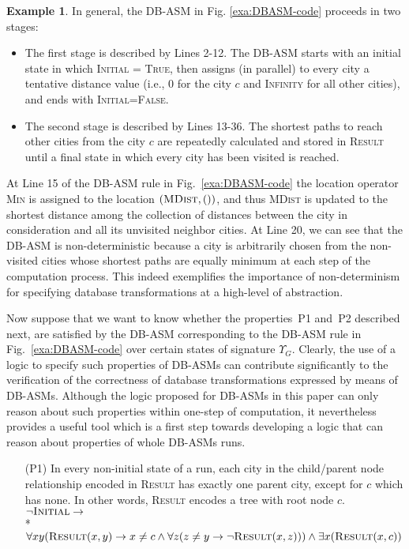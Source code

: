 \documentclass[preprint,11pt]{elsarticle}
\theoremstyle{definition}
\newtheorem{example}{Example}[section]
\theoremstyle{remark}
\begin{document}
\begin{example}
In general, the DB-ASM in Fig. \ref{exa:DBASM-code} proceeds in two stages:

\begin{itemize}

\item The first
stage is described by Lines 2-12. The DB-ASM starts with an initial state in which
\textsc{Initial} = \textsc{True}, then assigns (in parallel) to every city a tentative distance
value (i.e., 0 for the city $c$ and \textsc{Infinity} for all other
cities), and ends with \textsc{Initial}=\textsc{False}.

\item The second stage is described by Lines 13-36. The
shortest paths to reach other cities from the city $c$ are repeatedly
calculated and stored in \textsc{Result} until a final state in which every city has been visited is reached.

\end{itemize}

At Line 15 of the DB-ASM rule in Fig.~\ref{exa:DBASM-code} the location operator
\textsc{Min} is assigned to the location $(\textsc{MDist},())$, and thus
\textsc{MDist} is updated to the shortest distance among the collection of distances
between the city in consideration and all its unvisited neighbor
cities. At Line 20, we can see that the DB-ASM is non-deterministic
because a city is arbitrarily chosen from the non-visited cities
 whose shortest paths are equally minimum at each step
of the computation process. This indeed exemplifies the importance
of non-determinism for specifying database transformations at a
high-level of abstraction.

Now suppose that we want to know whether the properties~P1 and~P2 described next, are satisfied by the DB-ASM corresponding to the DB-ASM rule in Fig.~\ref{exa:DBASM-code} over certain states of signature $\Upsilon_G$. Clearly, the use of a logic to specify such properties of DB-ASMs can contribute significantly to the verification of the correctness of database transformations expressed by means of DB-ASMs. Although the logic proposed for DB-ASMs in this paper can only reason about such properties within one-step of computation, it nevertheless provides a useful tool which is a first step towards developing a logic that can reason about properties of whole DB-ASMs runs.


\begin{enumerate}

\item[(P1)] In every non-initial state of a run, each city in the child/parent node relationship encoded in \textsc{Result} has exactly one parent city, except for $c$ which has none. In other words, \textsc{Result} encodes a tree with root node $c$.\\[0.2cm]
$\neg \textsc{Initial} \rightarrow$\\*
\hspace*{0.8cm}$\forall x y (\textsc{Result}(x,y) \rightarrow  x \neq c \wedge \forall z (z \neq y \rightarrow \neg \textsc{Result}(x,z))) \wedge \exists x (\textsc{Result}(x,c))$\\[0.2cm]



\end{enumerate}
\end{example}
\end{document}
